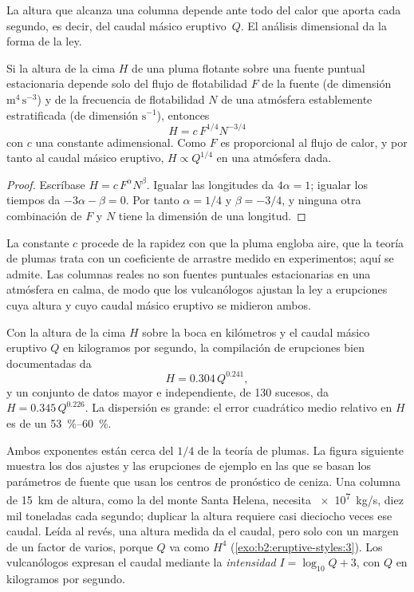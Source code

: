 La altura que alcanza una columna depende ante todo del calor que aporta cada
segundo, es decir, del caudal másico eruptivo~$Q$. El análisis dimensional da la
forma de la ley.

\begin{proposition}\label{prop:b2:eruptive-styles:plume}
Si la altura de la cima $H$ de una pluma flotante sobre una fuente puntual estacionaria depende solo
del flujo de flotabilidad $F$ de la fuente (de dimensión $\mathrm{m^4\,s^{-3}}$) y de la
frecuencia de flotabilidad $N$ de una atmósfera establemente estratificada (de dimensión
$\mathrm{s^{-1}}$), entonces
\[
H = c\,F^{1/4}N^{-3/4}
\]
con $c$ una constante adimensional. Como $F$ es proporcional al flujo de calor, y por tanto
al caudal másico eruptivo, $H \propto Q^{1/4}$ en una atmósfera dada.
\end{proposition}

\begin{proof}
Escríbase $H = c\,F^{\alpha}N^{\beta}$. Igualar las longitudes da $4\alpha = 1$; igualar
los tiempos da $-3\alpha - \beta = 0$. Por tanto $\alpha = 1/4$ y $\beta = -3/4$, y ninguna
otra combinación de $F$ y $N$ tiene la dimensión de una longitud.
\end{proof}

La constante $c$ procede de la rapidez con que la pluma engloba aire, que la teoría de plumas
trata con un coeficiente de arrastre medido en experimentos; aquí se
admite. Las columnas reales no son fuentes puntuales estacionarias en una atmósfera en calma, de modo que
los vulcanólogos ajustan la ley a erupciones cuya altura y cuyo caudal másico eruptivo se
midieron ambos.

\begin{proposition}\label{prop:b2:eruptive-styles:mastin}
Con la altura de la cima $H$ sobre la boca en kilómetros y el caudal másico eruptivo
$Q$ en kilogramos por segundo, la compilación de erupciones bien documentadas da
\[
H = 0.304\,Q^{0.241},
\]
y un conjunto de datos mayor e independiente, de 130 sucesos, da $H = 0.345\,Q^{0.226}$.
La dispersión es grande: el error cuadrático medio relativo en $H$ es de un
\qtyrange{53}{60}{\percent}.
\end{proposition}
\admitted

Ambos exponentes están cerca del $1/4$ de la teoría de plumas. La figura siguiente muestra
los dos ajustes y las erupciones de ejemplo en las que se basan los parámetros de fuente que usan
los centros de pronóstico de ceniza. Una columna de \qty{15}{km} de altura, como la del monte
Santa Helena, necesita \qty{e7}{kg/s}, diez mil toneladas cada segundo; duplicar la
altura requiere casi dieciocho veces ese caudal. Leída al revés, una altura medida da
el caudal, pero solo con un margen de un factor de varios, porque $Q$ va como $H^4$
(\cref{exo:b2:eruptive-styles:3}). Los vulcanólogos expresan el caudal mediante la \emph{intensidad} $I =
\log_{10}Q + 3$, con $Q$ en kilogramos por segundo.


